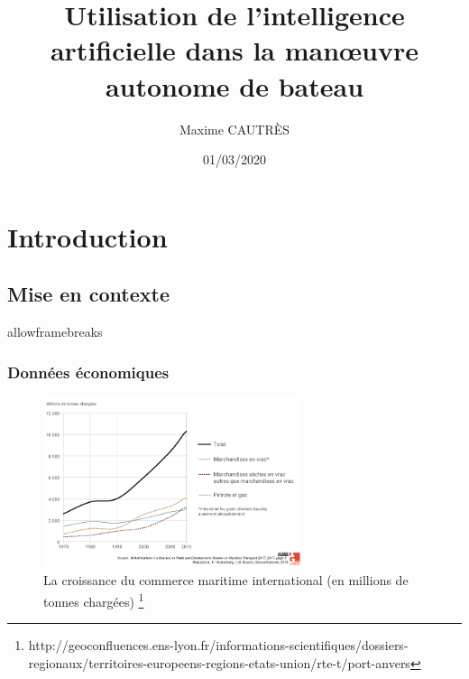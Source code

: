 \documentclass[8pt]{beamer}
\title[IA et conduite autonome]{Utilisation de l'intelligence artificielle dans la manœuvre autonome de bateau}
\author{Maxime CAUTRÈS}
\institute{Lycée Blaise Pascal}
\date{01/03/2020}
\begin{document}
\begin{frame}
  \titlepage
\end{frame}


\section{Introduction}

\subsection{Mise en contexte}


\begin{frame}{allowframebreaks}{\label{deb}}
  
  \frametitle{Données économiques}
  \begin{figure}
    \begin{center}
      \includegraphics[height=50mm]{courbe_evo_bateau.png}
      \caption{La croissance du commerce maritime international (en millions de tonnes chargées) \footnote{http://geoconfluences.ens-lyon.fr/informations-scientifiques/dossiers-regionaux/territoires-europeens-regions-etats-union/rte-t/port-anvers}}
    \end{center}
  \end{figure}
  
\end{frame}
\end{document}
